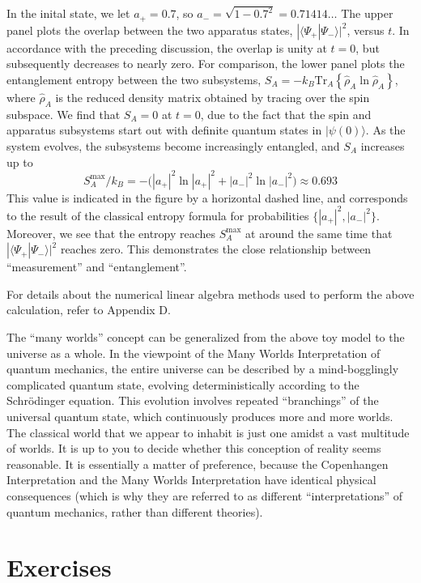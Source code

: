 \documentclass[pra,12pt]{revtex4}
\begin{document}
In the inital state, we let $a_+ = 0.7$, so $a_- = \sqrt{1-0.7^2} =
0.71414\dots$ The upper panel plots the overlap between the two
apparatus states, $|\langle\Psi_+|\Psi_-\rangle|^2$, versus $t$.  In
accordance with the preceding discussion, the overlap is unity at $t =
0$, but subsequently decreases to nearly zero.  For comparison, the
lower panel plots the entanglement entropy between the two subsystems,
$S_A = -k_B \mathrm{Tr}_A\left\{\hat{\rho}_A\ln\hat{\rho}_A\right\}$,
where $\hat{\rho}_A$ is the reduced density matrix obtained by tracing
over the spin subspace.  We find that $S_A = 0$ at $t=0$, due to the
fact that the spin and apparatus subsystems start out with definite
quantum states in $|\psi(0)\rangle$.  As the system evolves, the
subsystems become increasingly entangled, and $S_A$ increases up to
$$S_A^{\mathrm{max}}/k_B = - \Big( |a_+|^2 \ln|a_+|^2 + |a_-|^2\ln|a_-|^2 \Big) \approx 0.693$$
This value is indicated in the figure by a horizontal dashed line, and
corresponds to the result of the classical entropy formula for
probabilities $\{|a_+|^2,|a_-|^2\}$.  Moreover, we see that the
entropy reaches $S_A^{\mathrm{max}}$ at around the same time that
$|\langle\Psi_+|\Psi_-\rangle|^2$ reaches zero.  This demonstrates the
close relationship between ``measurement'' and ``entanglement''.

For details about the numerical linear algebra methods used to perform
the above calculation, refer to Appendix D.

The ``many worlds'' concept can be generalized from the above toy
model to the universe as a whole.  In the viewpoint of the Many Worlds
Interpretation of quantum mechanics, the entire universe can be
described by a mind-bogglingly complicated quantum state, evolving
deterministically according to the Schr\"odinger equation.  This
evolution involves repeated ``branchings'' of the universal quantum
state, which continuously produces more and more worlds.  The
classical world that we appear to inhabit is just one amidst a vast
multitude of worlds.  It is up to you to decide whether this
conception of reality seems reasonable.  It is essentially a matter of
preference, because the Copenhangen Interpretation and the Many Worlds
Interpretation have identical physical consequences (which is why they
are referred to as different ``interpretations'' of quantum mechanics,
rather than different theories).




\section*{Exercises}
\end{document}
